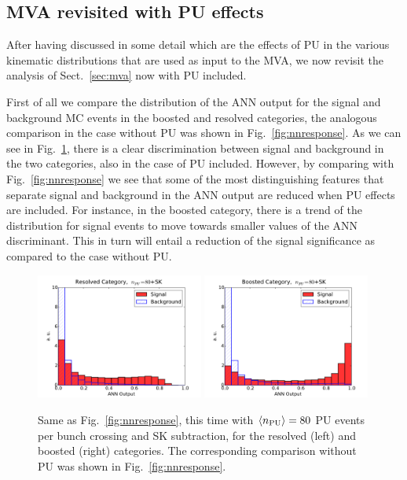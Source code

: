 \subsection{MVA revisited with PU effects}

After having discussed in some detail which are the effects
of PU in the various kinematic distributions that are used
as input to the MVA, we now revisit the analysis
of Sect.~\ref{sec:mva} now with PU included.


First of all we compare the distribution of the ANN output for the
signal and background MC events in the boosted and resolved categories,
the analogous comparison in the case without PU was shown
in Fig.~\ref{fig:nnresponse}.
%
As we can see in Fig.~\ref{fig:nnresponse_PU}, there is a clear discrimination
between signal and background in the two categories, also
in the case of PU included.
%
However, by comparing with Fig.~\ref{fig:nnresponse} we see
that some of the most distinguishing features that separate signal
and background in the ANN output are reduced when PU effects
are included.
%
For instance, in the boosted category, there is a trend of the distribution
for signal events to move towards smaller values of the
ANN discriminant.
%
This in turn will entail a reduction of the signal significance as
compared to the case without PU.

\begin{figure}[t]
  \begin{center}
\includegraphics[width=0.49\textwidth]{plots/Resolved_disc_SKPU80.pdf}
\includegraphics[width=0.49\textwidth]{plots/Boosted_disc_SKPU80.pdf}
\caption{\small Same as Fig.~\ref{fig:nnresponse},
  this time with $\left\langle n_{\rm PU}\right\rangle=80$ PU events per bunch crossing
  and SK subtraction, for the resolved (left) and boosted
  (right) categories.
  The corresponding comparison without PU was shown in
  Fig.~\ref{fig:nnresponse}.
}
\label{fig:nnresponse_PU}
\end{center}
\end{figure}


